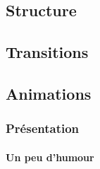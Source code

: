 \documentclass[xcolor=table, usenames,dvipsnames]{beamer}
\begin{document}
\subsection{Structure}


\subsection{Transitions}


\subsection{Animations}


\begin{frame}
\frametitle{Présentation}
\framesubtitle{Un peu d'humour}

\begin{center}
\end{center}

\end{frame}

\end{document}
